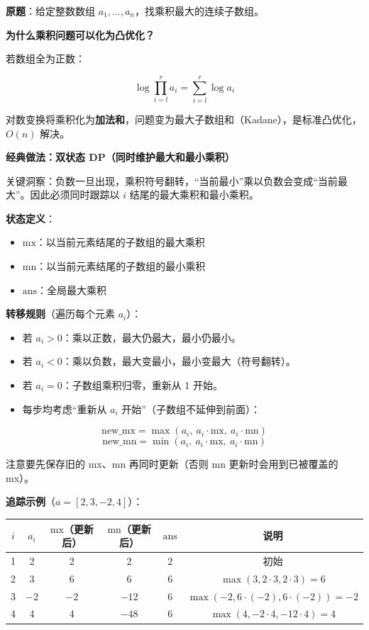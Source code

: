 \documentclass[12pt, a4paper]{ctexart}
\begin{document}
\begin{blackboard}

\textbf{原题}：给定整数数组 $a_1, \ldots, a_n$，找乘积最大的连续子数组。

\textbf{为什么乘积问题可以化为凸优化？}

若数组全为正数：

$$\log \prod_{i=l}^{r} a_i = \sum_{i=l}^{r} \log a_i$$

对数变换将乘积化为\textbf{加法和}，问题变为最大子数组和（Kadane），是标准凸优化，$O(n)$ 解决。

\textbf{经典做法：双状态 DP（同时维护最大和最小乘积）}

关键洞察：负数一旦出现，乘积符号翻转，``当前最小''乘以负数会变成``当前最大''。因此必须同时跟踪以 $i$ 结尾的最大乘积和最小乘积。

\textbf{状态定义}：
\begin{itemize}
    \item $\text{mx}$：以当前元素结尾的子数组的最大乘积
    \item $\text{mn}$：以当前元素结尾的子数组的最小乘积
    \item $\text{ans}$：全局最大乘积
\end{itemize}

\textbf{转移规则}（遍历每个元素 $a_i$）：
\begin{itemize}
    \item 若 $a_i > 0$：乘以正数，最大仍最大，最小仍最小。
    \item 若 $a_i < 0$：乘以负数，最大变最小，最小变最大（符号翻转）。
    \item 若 $a_i = 0$：子数组乘积归零，重新从 1 开始。
    \item 每步均考虑``重新从 $a_i$ 开始''（子数组不延伸到前面）：
\end{itemize}

$$\text{new\_mx} = \max(a_i,\ a_i \cdot \text{mx},\ a_i \cdot \text{mn})$$
$$\text{new\_mn} = \min(a_i,\ a_i \cdot \text{mx},\ a_i \cdot \text{mn})$$

注意要先保存旧的 mx、mn 再同时更新（否则 mn 更新时会用到已被覆盖的 mx）。

\textbf{追踪示例}（$a = [2, 3, -2, 4]$）：

\begin{center}
\begin{tabular}{cccccc}
\toprule
$i$ & $a_i$ & $\text{mx}$（更新后） & $\text{mn}$（更新后） & $\text{ans}$ & 说明 \\
\midrule
1 & 2  & 2   & 2   & 2  & 初始 \\
2 & 3  & 6   & 6   & 6  & $\max(3, 2{\cdot}3, 2{\cdot}3)=6$ \\
3 & $-2$ & $-2$ & $-12$ & 6  & $\max(-2, 6{\cdot}(-2), 6{\cdot}(-2))=-2$ \\
4 & 4  & 4   & $-48$ & 6  & $\max(4, -2{\cdot}4, -12{\cdot}4)=4$ \\
\bottomrule
\end{tabular}
\end{center}


\end{blackboard}
\end{document}
